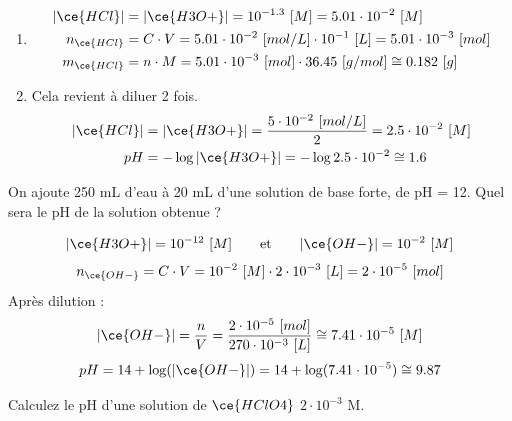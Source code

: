 \documentclass[
  11pt,
  french,
  a4paper,
  openany]{book}
\providecommand{\tightlist}{%
  \setlength{\itemsep}{0pt}\setlength{\parskip}{0pt}}
\begin{document}
\begin{Answer}

\begin{enumerate}
\def\labelenumi{\alph{enumi}.}
\tightlist
\item
  \[
  \begin{split}
  |\ce{HCl}| &= |\ce{H3O+}| = 10^{-1.3}\ [M] = 5.01 \cdot 10^{-2}\ [M] \\
  n_{\ce{HCl}} &= C \cdot V = 5.01 \cdot 10^{-2}\ [mol/L] \cdot 10^{-1}\ [L] = 5.01 \cdot 10^{-3}\ [mol] \\
  m_{\ce{HCl}} &= n \cdot M = 5.01 \cdot 10^{-3}\ [mol] \cdot 36.45\ [g/mol] \cong 0.182\ [g]
  \end{split}
  \]
\item
  Cela revient à diluer 2 fois.
  \[
  \begin{split}
  |\ce{HCl}| &= |\ce{H3O+}| = \frac{5 \cdot 10^{-2}\ [mol/L]}{2} = 2.5 \cdot 10^{-2}\ [M] \\
  pH &= - \log |\ce{H3O+}| = - \log 2.5 \cdot 10^{-2} \cong 1.6
  \end{split}
  \]
\end{enumerate}


\end{Answer}

\clearpage

\begin{Exercise}
On ajoute 250 mL d'eau à 20 mL d'une solution de base forte, de pH = 12. Quel sera le pH de la solution obtenue ?

\end{Exercise}

\begin{Answer}
\[
\begin{split}
|\ce{H3O+}| = 10^{-12}\ [M]
\end{split}
\qquad \text{et} \qquad
\begin{split}
|\ce{OH-}| = 10^{-2}\ [M]
\end{split}
\]
\[
n_{\ce{OH-}} = C \cdot V = 10^{-2}\ [M] \cdot 2 \cdot 10^{-3}\ [L] = 2 \cdot 10^{-5}\ [mol]
\]
Après dilution :
\[
|\ce{OH-}| = \frac{n}{V} = \frac{2 \cdot 10^{-5}\ [mol]}{270 \cdot 10^{-3}\ [L]} \cong 7.41 \cdot 10^{-5}\ [M]
\]
\[
pH = 14 + \log(|\ce{OH-}|) = 14 + \log(7.41 \cdot 10^{-5}) \cong 9.87
\]

\end{Answer}

\begin{Exercise}
Calculez le pH d'une solution de \(\ce{HClO4}\) \(2 \cdot 10^{-3}\) M.

\end{Exercise}
\end{document}
